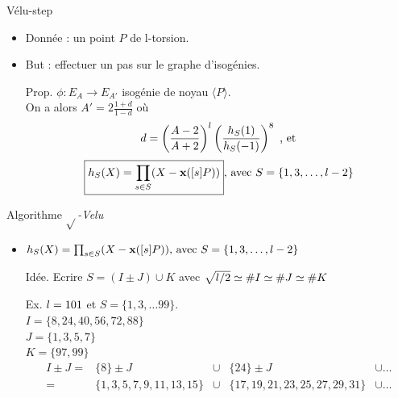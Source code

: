 \documentclass{beamer}
\begin{document}
\begin{frame}[fragile]{Vélu-step}
\begin{itemize}
	\item Donnée : un point $P$ de l-torsion.
	\item But : effectuer un pas sur le graphe d'isogénies.
	\item[Prop.]{$\phi:E_A\rightarrow E_{A'}$ isogénie de noyau $\langle P \rangle$.\\
		On a alors $\boxed{A'=2\frac{1+d}{1-d}}$ où\\
		\[d = \left(\frac{A-2}{A+2}\right)^{\mathnormal{l}} \left( \frac{h_S(1)}{h_S(-1)}\right)^8 \text{ , et}\]
			\[\boxed{h_S(X) = \prod_{s\in S}(X-\textbf{x}([s]P))}\text{, avec }S=\{1,3, \ldots, \mathnormal{l}-2\}\]}
\end{itemize}
\end{frame}

\begin{frame}[fragile]{Algorithme $\sqrt{}$\textit{-Velu}}
	\begin{itemize}
		\item{$h_S(X) = \prod_{s\in S}(X-\textbf{x}([s]P))\text{, avec }S=\{1,3, \ldots, \mathnormal{l}-2\}$}
		\item[Idée.] {Ecrire $S=(I\pm J) \cup K$} avec $\sqrt{\mathnormal{l}/2}\simeq \#I \simeq \#J \simeq \#K$
		\vfill
		\item[Ex.]	$\mathnormal{l} = 101$ et $S = \lbrace 1, 3, \ldots 99 \rbrace$.\\
		$I = \lbrace 8, 24, 40, 56, 72, 88 \rbrace $\\
		$J = \lbrace1, 3, 5, 7 \rbrace $\\
		$K = \lbrace 97, 99 \rbrace $\\
		
		\[\begin{array}{rcccl}
			I\pm J =& \{8\}\pm J & \cup & \{24\}\pm J & \cup \ldots \\
			=&  {\scriptstyle \lbrace 1, 3, 5, 7, 9, 11, 13, 15\rbrace } & \cup &  {\scriptstyle \lbrace 17, 19, 21, 23, 25, 27, 29, 31\rbrace } & \cup \ldots
		\end{array}\]
	\end{itemize}
\end{frame}
\end{document}
